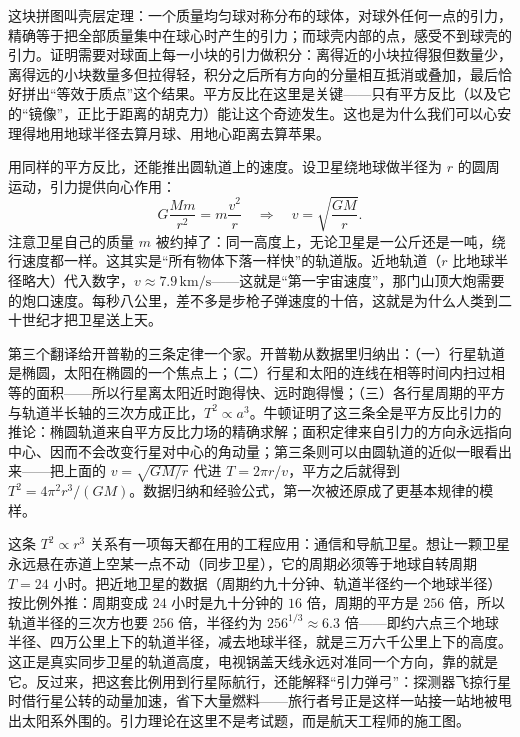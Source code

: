 \begin{mathbridge}
这块拼图叫壳层定理：一个质量均匀球对称分布的球体，对球外任何一点的引力，精确等于把全部质量集中在球心时产生的引力；而球壳内部的点，感受不到球壳的引力。证明需要对球面上每一小块的引力做积分：离得近的小块拉得狠但数量少，离得远的小块数量多但拉得轻，积分之后所有方向的分量相互抵消或叠加，最后恰好拼出“等效于质点”这个结果。平方反比在这里是关键——只有平方反比（以及它的“镜像”，正比于距离的胡克力）能让这个奇迹发生。这也是为什么我们可以心安理得地用地球半径去算月球、用地心距离去算苹果。

用同样的平方反比，还能推出圆轨道上的速度。设卫星绕地球做半径为 \(r\) 的圆周运动，引力提供向心作用：
\[
G\frac{M m}{r^{2}} = m\frac{v^{2}}{r}
\quad\Longrightarrow\quad
v = \sqrt{\frac{GM}{r}}.
\]
注意卫星自己的质量 \(m\) 被约掉了：同一高度上，无论卫星是一公斤还是一吨，绕行速度都一样。这其实是“所有物体下落一样快”的轨道版。近地轨道（\(r\) 比地球半径略大）代入数字，\(v \approx 7.9\,\mathrm{km/s}\)——这就是“第一宇宙速度”，那门山顶大炮需要的炮口速度。每秒八公里，差不多是步枪子弹速度的十倍，这就是为什么人类到二十世纪才把卫星送上天。
\end{mathbridge}

第三个翻译给开普勒的三条定律一个家。开普勒从数据里归纳出：（一）行星轨道是椭圆，太阳在椭圆的一个焦点上；（二）行星和太阳的连线在相等时间内扫过相等的面积——所以行星离太阳近时跑得快、远时跑得慢；（三）各行星周期的平方与轨道半长轴的三次方成正比，\(T^{2} \propto a^{3}\)。牛顿证明了这三条全是平方反比引力的推论：椭圆轨道来自平方反比力场的精确求解；面积定律来自引力的方向永远指向中心、因而不会改变行星对中心的角动量；第三条则可以由圆轨道的近似一眼看出来——把上面的 \(v = \sqrt{GM/r}\) 代进 \(T = 2\pi r/v\)，平方之后就得到 \(T^{2} = 4\pi^{2}r^{3}/(GM)\)。数据归纳和经验公式，第一次被还原成了更基本规律的模样。

这条 \(T^{2} \propto r^{3}\) 关系有一项每天都在用的工程应用：通信和导航卫星。想让一颗卫星永远悬在赤道上空某一点不动（同步卫星），它的周期必须等于地球自转周期 \(T = 24\) 小时。把近地卫星的数据（周期约九十分钟、轨道半径约一个地球半径）按比例外推：周期变成 \(24\) 小时是九十分钟的 \(16\) 倍，周期的平方是 \(256\) 倍，所以轨道半径的三次方也要 \(256\) 倍，半径约为 \(256^{1/3} \approx 6.3\) 倍——即约六点三个地球半径、四万公里上下的轨道半径，减去地球半径，就是三万六千公里上下的高度。这正是真实同步卫星的轨道高度，电视锅盖天线永远对准同一个方向，靠的就是它。反过来，把这套比例用到行星际航行，还能解释“引力弹弓”：探测器飞掠行星时借行星公转的动量加速，省下大量燃料——旅行者号正是这样一站接一站地被甩出太阳系外围的。引力理论在这里不是考试题，而是航天工程师的施工图。

